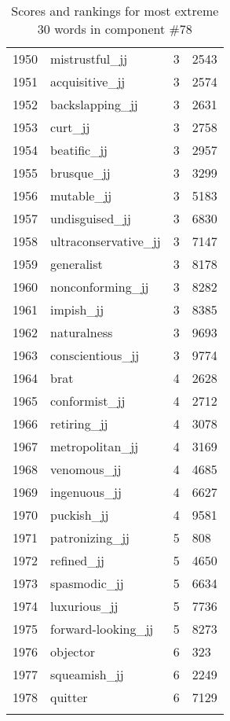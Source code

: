 \begin{longtable}[!htbp]{| rlr@{.}l |}
    1950 & mistrustful\_jj & 3 & 2543 \\
    1951 & acquisitive\_jj & 3 & 2574 \\
    1952 & backslapping\_jj & 3 & 2631 \\
    1953 & curt\_jj & 3 & 2758 \\
    1954 & beatific\_jj & 3 & 2957 \\
    1955 & brusque\_jj & 3 & 3299 \\
    1956 & mutable\_jj & 3 & 5183 \\
    1957 & undisguised\_jj & 3 & 6830 \\
    1958 & ultraconservative\_jj & 3 & 7147 \\
    1959 & generalist & 3 & 8178 \\
    1960 & nonconforming\_jj & 3 & 8282 \\
    1961 & impish\_jj & 3 & 8385 \\
    1962 & naturalness & 3 & 9693 \\
    1963 & conscientious\_jj & 3 & 9774 \\
    1964 & brat & 4 & 2628 \\
    1965 & conformist\_jj & 4 & 2712 \\
    1966 & retiring\_jj & 4 & 3078 \\
    1967 & metropolitan\_jj & 4 & 3169 \\
    1968 & venomous\_jj & 4 & 4685 \\
    1969 & ingenuous\_jj & 4 & 6627 \\
    1970 & puckish\_jj & 4 & 9581 \\
    1971 & patronizing\_jj & 5 & 808 \\
    1972 & refined\_jj & 5 & 4650 \\
    1973 & spasmodic\_jj & 5 & 6634 \\
    1974 & luxurious\_jj & 5 & 7736 \\
    1975 & forward-looking\_jj & 5 & 8273 \\
    1976 & objector & 6 & 323 \\
    1977 & squeamish\_jj & 6 & 2249 \\
    1978 & quitter & 6 & 7129 \\
    \hline
    \caption{Scores and rankings for most extreme 30 words in component \#78} \\
\end{longtable}
